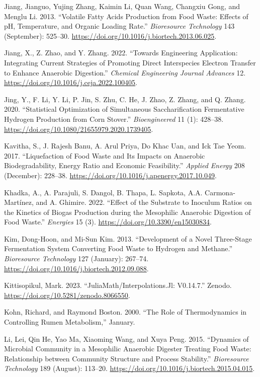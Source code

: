 \documentclass[11pt]{report}
\begin{document}
\begin{hangparas}{1.5em}{1}
\hypertarget{citeproc_bib_item_32}{Jiang, Jianguo, Yujing Zhang, Kaimin Li, Quan Wang, Changxiu Gong, and Menglu Li. 2013. “Volatile Fatty Acids Production from Food Waste: Effects of pH, Temperature, and Organic Loading Rate.” \textit{Bioresource Technology} 143 (September): 525–30. \url{https://doi.org/10.1016/j.biortech.2013.06.025}.}

\hypertarget{citeproc_bib_item_33}{Jiang, X., Z. Zhao, and Y. Zhang. 2022. “Towards Engineering Application: Integrating Current Strategies of Promoting Direct Interspecies Electron Transfer to Enhance Anaerobic Digestion.” \textit{Chemical Engineering Journal Advances} 12. \url{https://doi.org/10.1016/j.ceja.2022.100405}.}

\hypertarget{citeproc_bib_item_34}{Jing, Y., F. Li, Y. Li, P. Jin, S. Zhu, C. He, J. Zhao, Z. Zhang, and Q. Zhang. 2020. “Statistical Optimization of Simultaneous Saccharification Fermentative Hydrogen Production from Corn Stover.” \textit{Bioengineered} 11 (1): 428–38. \url{https://doi.org/10.1080/21655979.2020.1739405}.}

\hypertarget{citeproc_bib_item_35}{Kavitha, S., J. Rajesh Banu, A. Arul Priya, Do Khac Uan, and Ick Tae Yeom. 2017. “Liquefaction of Food Waste and Its Impacts on Anaerobic Biodegradability, Energy Ratio and Economic Feasibility.” \textit{Applied Energy} 208 (December): 228–38. \url{https://doi.org/10.1016/j.apenergy.2017.10.049}.}

\hypertarget{citeproc_bib_item_36}{Khadka, A., A. Parajuli, S. Dangol, B. Thapa, L. Sapkota, A.A. Carmona-Martínez, and A. Ghimire. 2022. “Effect of the Substrate to Inoculum Ratios on the Kinetics of Biogas Production during the Mesophilic Anaerobic Digestion of Food Waste.” \textit{Energies} 15 (3). \url{https://doi.org/10.3390/en15030834}.}

\hypertarget{citeproc_bib_item_37}{Kim, Dong-Hoon, and Mi-Sun Kim. 2013. “Development of a Novel Three-Stage Fermentation System Converting Food Waste to Hydrogen and Methane.” \textit{Bioresource Technology} 127 (January): 267–74. \url{https://doi.org/10.1016/j.biortech.2012.09.088}.}

\hypertarget{citeproc_bib_item_38}{Kittisopikul, Mark. 2023. “JuliaMath/Interpolations.Jl: V0.14.7.” Zenodo. \url{https://doi.org/10.5281/zenodo.8066550}.}

\hypertarget{citeproc_bib_item_39}{Kohn, Richard, and Raymond Boston. 2000. “The Role of Thermodynamics in Controlling Rumen Metabolism,” January.}

\hypertarget{citeproc_bib_item_40}{Li, Lei, Qin He, Yao Ma, Xiaoming Wang, and Xuya Peng. 2015. “Dynamics of Microbial Community in a Mesophilic Anaerobic Digester Treating Food Waste: Relationship between Community Structure and Process Stability.” \textit{Bioresource Technology} 189 (August): 113–20. \url{https://doi.org/10.1016/j.biortech.2015.04.015}.}


\end{hangparas}
\end{document}
